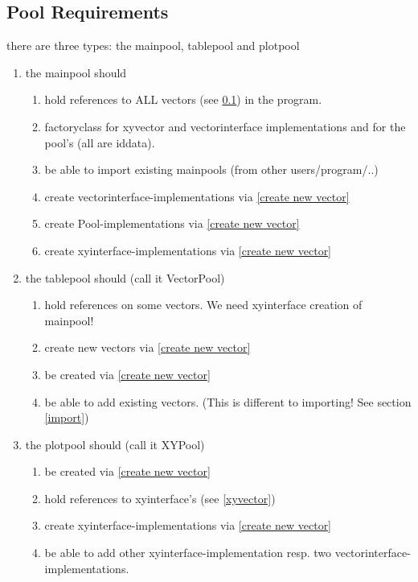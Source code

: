 \documentclass[12pt]{article}
\begin{document}
\subsection{Pool Requirements}
\label{pool req}there are three types: the mainpool, tablepool and plotpool
\begin{enumerate}
\item{the mainpool should}
	\begin{enumerate}
	\item hold references to ALL vectors (see \ref{pool req}) in the program.
    	\item \label{create new vector}factoryclass for xyvector and vectorinterface implementations and for the pool's (all are iddata).
	\item \label{import} be able to import existing mainpools (from other users/program/..)
    	\item create vectorinterface-implementations via \ref{create new vector}
    	\item create Pool-implementations via \ref{create new vector}
    	\item create xyinterface-implementations via \ref{create new vector}
	\end{enumerate}
\item{the tablepool should (call it VectorPool)}
\label{tablepool}
	\begin{enumerate}
	\item hold references on some vectors. We need xyinterface creation of mainpool!
    	\item create new vectors via \ref{create new vector}
    	\item be created via \ref{create new vector}
    	\item be able to add existing vectors. (This is different to importing! See section \ref{import})
	\end{enumerate}	
\item{the plotpool should (call it XYPool)}
	\begin{enumerate}
	\item be created via \ref{create new vector}
    	\item hold references to xyinterface's (see \ref{xyvector})
    	\item create xyinterface-implementations via \ref{create new vector}
    	\item be able to add other xyinterface-implementation resp. two vectorinterface-implementations.
	\end{enumerate}	
\end{enumerate}
\end{document}
